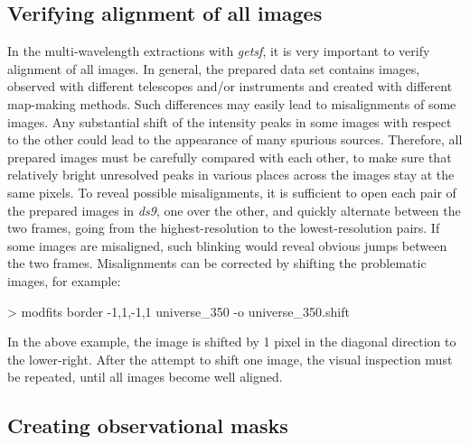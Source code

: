 \documentclass[a4paper,10pt]{article}
\begin{document}

\subsection{Verifying alignment of all images}
\label{alignment}
     
In the multi-wavelength extractions with \textsl{getsf}, it is very important to verify alignment of all images. In general, the
prepared data set contains images, observed with different telescopes and/or instruments and created with different map-making
methods. Such differences may easily lead to misalignments of some images. Any substantial shift of the intensity peaks in some
images with respect to the other could lead to the appearance of many spurious sources. Therefore, all prepared images must be
carefully compared with each other, to make sure that relatively bright unresolved peaks in various places across the images stay
at the same pixels. To reveal possible misalignments, it is sufficient to open each pair of the prepared images in \textsl{ds9},
one over the other, and quickly alternate between the two frames, going from the highest-resolution to the lowest-resolution pairs.
If some images are misaligned, such blinking would reveal obvious jumps between the two frames. Misalignments can be corrected by
shifting the problematic images, for example:
\begin{verbnobox}[\mbox{}\small]
> modfits border -1,1,-1,1 universe_350 -o universe_350.shift
\end{verbnobox}
In the above example, the image is shifted by 1 pixel in the diagonal direction to the lower-right. After the attempt to shift one
image, the visual inspection must be repeated, until all images become well aligned.


\subsection{Creating observational masks}
\label{omasks}
\end{document}
